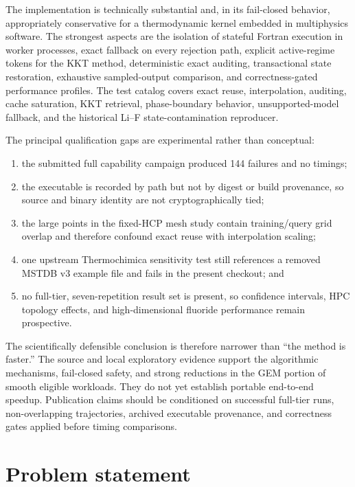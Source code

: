 \documentclass[11pt]{article}
\begin{document}
The implementation is technically substantial and, in its fail-closed behavior, appropriately
conservative for a thermodynamic kernel embedded in multiphysics software.  The strongest aspects
are the isolation of stateful Fortran execution in worker processes, exact fallback on every
rejection path, explicit active-regime tokens for the KKT method, deterministic exact auditing,
transactional state restoration, exhaustive sampled-output comparison, and correctness-gated
performance profiles.  The test catalog covers exact reuse, interpolation, auditing, cache
saturation, KKT retrieval, phase-boundary behavior, unsupported-model fallback, and the historical
Li--F state-contamination reproducer.

The principal qualification gaps are experimental rather than conceptual:
\begin{enumerate}[leftmargin=*]
  \item the submitted full capability campaign produced 144 failures and no timings;
  \item the executable is recorded by path but not by digest or build provenance, so source and
  binary identity are not cryptographically tied;
  \item the large points in the fixed-HCP mesh study contain training/query grid overlap and
  therefore confound exact reuse with interpolation scaling;
  \item one upstream Thermochimica sensitivity test still references a removed MSTDB v3 example
  file and fails in the present checkout; and
  \item no full-tier, seven-repetition result set is present, so confidence intervals, HPC
  topology effects, and high-dimensional fluoride performance remain prospective.
\end{enumerate}

The scientifically defensible conclusion is therefore narrower than ``the method is faster.''
The source and local exploratory evidence support the algorithmic mechanisms, fail-closed safety,
and strong reductions in the GEM portion of smooth eligible workloads.  They do not yet establish
portable end-to-end speedup.  Publication claims should be conditioned on successful full-tier
runs, non-overlapping trajectories, archived executable provenance, and correctness gates applied
before timing comparisons.

\section{Problem statement}
\end{document}
